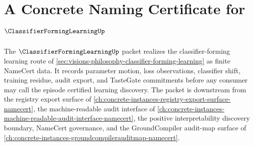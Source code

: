 \chapter{A Concrete Naming Certificate for $\ClassifierFormingLearningUp$}
\label{ch:concrete-instances-classifier-forming-learning-namecert}

The $\ClassifierFormingLearningUp$ packet realizes the classifier-forming
learning route of \autoref{sec:visions-philosophy-classifier-forming-learning}
as finite NameCert data. It records parameter motion, loss observations,
classifier shift, training residue, audit export, and TasteGate commitments
before any consumer may call the episode certified learning discovery. The
packet is downstream from the registry export surface of
\autoref{ch:concrete-instances-registry-export-surface-namecert}, the
machine-readable audit interface of
\autoref{ch:concrete-instances-machine-readable-audit-interface-namecert}, the
positive interpretability discovery boundary, NameCert governance, and the
GroundCompiler audit-map surface of
\autoref{ch:concrete-instances-groundcompilerauditmap-namecert}.

